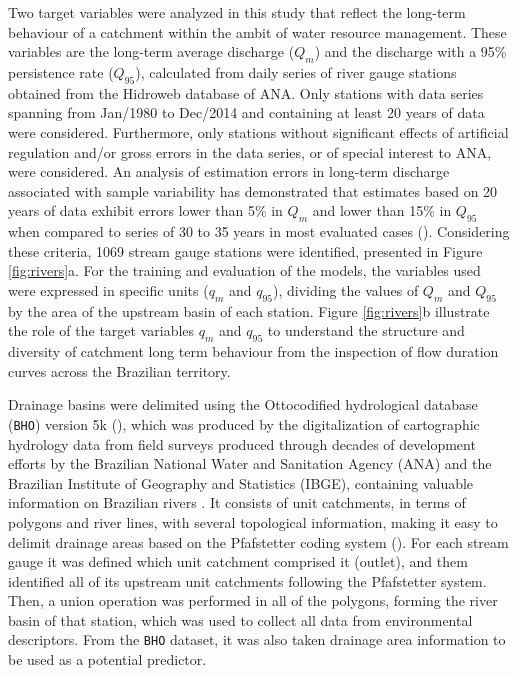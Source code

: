 \documentclass[12pt]{article}
\begin{document}
\par Two target variables were analyzed in this study that reflect the long-term behaviour of a catchment within the ambit of water resource management. These variables are the long-term average discharge ($Q_{m}$) and the discharge with a 95\% persistence rate ($Q_{95}$), calculated from daily series of river gauge stations obtained from the Hidroweb database of ANA. Only stations with data series spanning from Jan/1980 to Dec/2014 and containing at least 20 years of data were considered. Furthermore, only stations without significant effects of artificial regulation and/or gross errors in the data series, or of special interest to ANA, were considered. An analysis of estimation errors in long-term discharge associated with sample variability  has demonstrated that estimates based on 20 years of data exhibit errors lower than 5\% in $Q_{m}$ and lower than 15\% in $Q_{95}$ when compared to series of 30 to 35 years in most evaluated cases (\cite{collischonn2021}). Considering these criteria, 1069 stream gauge stations were identified, presented in Figure \ref{fig:rivers}a. For the training and evaluation of the models, the variables used were expressed in specific units ($q_{m}$ and $q_{95}$), dividing the values of $Q_{m}$ and $Q_{95}$ by the area of the upstream basin of each station. Figure \ref{fig:rivers}b illustrate the role of the target variables $q_{m}$ and $q_{95}$ to understand the structure and diversity of  catchment long term behaviour from the inspection of flow duration curves across the Brazilian territory. 

\par Drainage basins were delimited using the Ottocodified hydrological database (\texttt{BHO}) version 5k (\cite{ana2017}), which was produced by the digitalization of cartographic hydrology data from field surveys produced through decades of development efforts by the Brazilian National Water and Sanitation Agency (ANA) and the Brazilian Institute of Geography and Statistics (IBGE), containing valuable information on Brazilian rivers . It consists of unit catchments, in terms of polygons and river lines, with several topological information, making it easy to delimit drainage areas based on the Pfafstetter coding system (\cite{teixeira2022}). For each stream gauge it was defined which unit catchment comprised it (outlet), and them identified all of its upstream unit catchments following the Pfafstetter system. Then, a union operation was performed in all of the polygons, forming the river basin of that station, which was used to collect all data from environmental descriptors. From the \texttt{BHO} dataset, it was also taken drainage area information to be used as a potential predictor.
\end{document}
